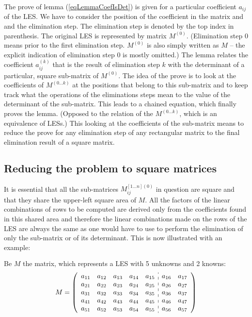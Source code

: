 The prove of lemma (\ref{eqLemmaCoefIsDet}) is given for a particular
coefficient $a_{ij}$ of the LES. We have to consider the position of the
coefficient in the matrix and and the elimination step. The elimination
step is denoted by the top index in parenthesis. The original LES is
represented by matrix $M^{(0)}$. (Elimination step 0 means prior to the
first elimination step. $M^{(0)}$ is also simply written as $M$ -- the
explicit indication of elimination step 0 is mostly omitted.) The lemma
relates the coefficient $a^{(k)}_{ij}$ that is the result of elimination
step $k$ with the determinant of a particular, square sub-matrix of
$M^{(0)}$. The idea of the prove is to look at the coefficients of $M^{(0
\ldots k)}$ at the positions that belong to this sub-matrix and to keep
track what the operations of the eliminations steps mean to the value of
the determinant of the sub-matrix. This leads to a chained equation, which
finally proves the lemma. (Opposed to the relation of the $M^{(0 \ldots
k)}$, which is an equivalence of LESs.) This looking at the coefficients
of the sub-matrix means to reduce the prove for any elimination step of
any rectangular matrix to the final elimination result of a square
matrix.


\subsection{Reducing the problem to square matrices}
\label{secReduceToSqMat}

It is essential that all the sub-matrices $M^{[1 \ldots n](0)}_{ij}$ in
question are square and that they share the upper-left square area of $M$.
All the factors of the linear combinations of rows to be computed are
derived only from the coefficients found in this shared area and therefore
the linear combinations made on the rows of the LES are always the same as
one would have to use to perform the elimination of only the sub-matrix or
of its determinant. This is now illustrated with an example:

Be $M$ the matrix, which represents a LES with 5 unknowns and 2
knowns:
\begin{equation}
M=\left(
\begin{array}{ccccc:cc}
a_{11} & a_{12} & a_{13} & a_{14} & a_{15} & a_{16} & a_{17} \\
a_{21} & a_{22} & a_{23} & a_{24} & a_{25} & a_{26} & a_{27} \\
a_{31} & a_{32} & a_{33} & a_{34} & a_{35} & a_{36} & a_{37} \\
a_{41} & a_{42} & a_{43} & a_{44} & a_{45} & a_{46} & a_{47} \\
a_{51} & a_{52} & a_{53} & a_{54} & a_{55} & a_{56} & a_{57} \\
\end{array}
\right)
\end{equation}

